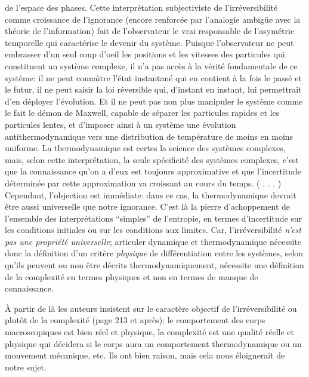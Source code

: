 {de l'espace des phases. 
\smallskip
Cette interpr\'etation subjectiviste de l'irr\'e\-ver\-si\-bi\-lit\'e comme 
croissance de l'ignorance (encore renforc\'ee par l'analogie ambig\"ue 
avec la th\'eorie de l'infor\-ma\-tion) fait de l'observateur le vrai 
responsable de l'asym\'etrie temporelle qui caract\'erise le devenir 
du syst\`eme. Puisque l'observateur ne peut embrasser d'un seul coup 
d'oeil les positions et les vitesses des particules qui constituent
un syst\`eme complexe, il n'a pas acc\`es \`a la v\'erit\'e fondamentale 
de ce syst\`eme: il ne peut conna{\^\i}tre l'\'etat instantan\'e qui en 
contient \`a la fois le pass\'e et le futur, il ne peut saisir la loi 
r\'eversible qui, d'instant en instant, lui permettrait d'en d\'eployer 
l'\'evolution. Et il ne peut pas non plus manipuler le syst\`eme comme le 
fait le d\'emon de Maxwell, capable de s\'eparer les particules rapides 
et les particules lentes, et d'imposer ainsi \`a un syst\`eme une 
\'evolution antithermodynamique vers une distribution de temp\'erature 
de moins en moins uniforme. 
\smallskip
La thermodynamique est certes la science des syst\`emes complexes, 
mais, selon cette interpr\'etation, la seule sp\'ecificit\'e des 
syst\`emes complexes, c'est que la connaissance qu'on a d'eux est 
toujours approximative et que l'incertitude d\'etermin\'ee par cette 
approximation va croissant au cours du temps. ( . . .  )
\smallskip
Cependant, l'objection est imm\'ediate: dans ce cas, la thermodynamique 
devrait \^etre aussi universelle que notre ignorance. C'est l\`a la pierre 
d'achoppement de l'ensemble des interpr\'etations ``{simples}'' de
l'entropie, en termes d'incertitude sur les conditions initiales ou sur 
les conditions aux limites. Car, l'irr\'eversibilit\'e {\it n'est pas 
une propri\'et\'e universelle}; articuler dynamique et thermodynamique 
n\'ecessite donc la d\'efinition d'un crit\`ere {\it physique} de 
diff\'erentiation entre les syst\`emes, selon qu'ils peuvent ou non 
\^etre d\'ecrits thermodynamiquement, n\'ecessite une d\'efinition de 
la complexit\'e en termes physiques et non en termes de manque de 
connaissance. \par }
\medskip
\`A partir de l\`a les auteurs insistent sur le caract\`ere objectif 
de l'irr\'e\-ver\-si\-bi\-lit\'e ou plut\^ot de la complexit\'e (page 213 
et apr\`es): le comportement des corps macroscopiques est bien r\'eel et 
physique, la  complexit\'e est une qualit\'e r\'eelle et physique qui 
d\'ecidera si le corps aura un comportement thermodynamique ou un 
mouvement m\'ecanique, etc. Ils ont bien raison, mais cela nous 
\'eloignerait de notre sujet.  

